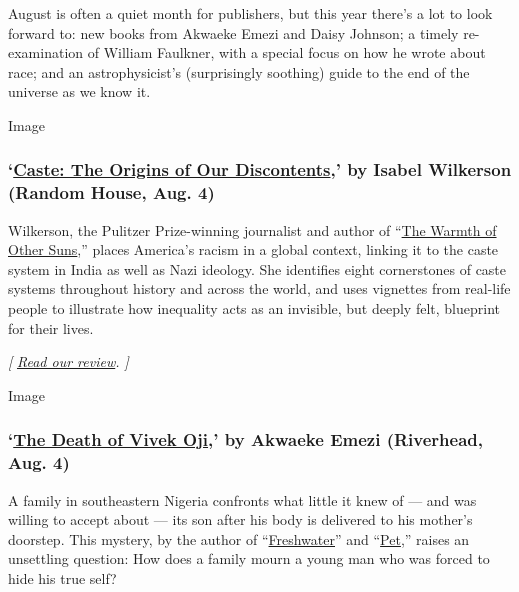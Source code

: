 August is often a quiet month for publishers, but this year there's a
lot to look forward to: new books from Akwaeke Emezi and Daisy Johnson;
a timely re-examination of William Faulkner, with a special focus on how
he wrote about race; and an astrophysicist's (surprisingly soothing)
guide to the end of the universe as we know it.

Image

\hypertarget{caste-the-origins-of-our-discontents-by-isabel-wilkerson-random-house-aug-4}{%
\subsubsection{\texorpdfstring{`\href{https://www.penguinrandomhouse.com/books/653196/caste-by-isabel-wilkerson/}{Caste:
The Origins of Our Discontents},' by Isabel Wilkerson (Random House,
Aug.
4)}{`Caste: The Origins of Our Discontents,' by Isabel Wilkerson (Random House, Aug. 4)}}\label{caste-the-origins-of-our-discontents-by-isabel-wilkerson-random-house-aug-4}}

Wilkerson, the Pulitzer Prize-winning journalist and author of
``\href{https://www.nytimes.com/2010/09/05/books/review/Oshinsky-t.html}{The
Warmth of Other Suns},'' places America's racism in a global context,
linking it to the caste system in India as well as Nazi ideology. She
identifies eight cornerstones of caste systems throughout history and
across the world, and uses vignettes from real-life people to illustrate
how inequality acts as an invisible, but deeply felt, blueprint for
their lives.

\emph{{[}}
\href{https://www.nytimes.com/2020/07/31/books/review-caste-isabel-wilkerson-origins-of-our-discontents.html}{\emph{Read
our review}}\emph{. {]}}

Image

\hypertarget{the-death-of-vivek-oji-by-akwaeke-emezi-riverhead-aug-4}{%
\subsubsection{\texorpdfstring{`\href{https://www.penguinrandomhouse.com/books/604152/the-death-of-vivek-oji-by-akwaeke-emezi/}{The
Death of Vivek Oji},' by Akwaeke Emezi (Riverhead, Aug.
4)}{`The Death of Vivek Oji,' by Akwaeke Emezi (Riverhead, Aug. 4)}}\label{the-death-of-vivek-oji-by-akwaeke-emezi-riverhead-aug-4}}

A family in southeastern Nigeria confronts what little it knew of ---
and was willing to accept about --- its son after his body is delivered
to his mother's doorstep. This mystery, by the author of
``\href{https://www.nytimes.com/2018/02/26/books/review/freshwater-akwaeke-emezi.html}{Freshwater}''
and
``\href{https://www.nytimes.com/2019/09/30/books/review/pet-akwaeke-emezi.html}{Pet},''
raises an unsettling question: How does a family mourn a young man who
was forced to hide his true self?

